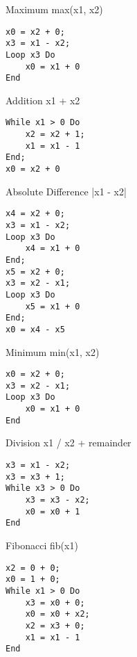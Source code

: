 \begin{minipage}{0.5\linewidth}
\begin{example2}{Maximum} max(x1, x2)
\begin{lstlisting}[style=Pseudocode, aboveskip=-0.05\baselineskip, belowskip=-0.5\baselineskip]
x0 = x2 + 0;
x3 = x1 - x2;
Loop x3 Do
    x0 = x1 + 0
End
\end{lstlisting}
\end{example2}

\begin{example2}{Addition} x1 + x2
\begin{lstlisting}[style=Pseudocode, aboveskip=-0.05\baselineskip, belowskip=-0.5\baselineskip]
While x1 > 0 Do
    x2 = x2 + 1;
    x1 = x1 - 1
End;
x0 = x2 + 0
\end{lstlisting}    
\end{example2}

\begin{example2}{Absolute Difference} |x1 - x2|
\begin{lstlisting}[style=Pseudocode, aboveskip=-0.05\baselineskip, belowskip=-0.5\baselineskip]
x4 = x2 + 0;
x3 = x1 - x2;
Loop x3 Do
    x4 = x1 + 0
End;
x5 = x2 + 0;
x3 = x2 - x1;
Loop x3 Do
    x5 = x1 + 0
End;
x0 = x4 - x5
\end{lstlisting}
\end{example2}
\end{minipage}
\begin{minipage}{0.5\linewidth}
\begin{example2}{Minimum} min(x1, x2)
\begin{lstlisting}[style=Pseudocode, aboveskip=-0.05\baselineskip, belowskip=-0.5\baselineskip]
x0 = x2 + 0;
x3 = x2 - x1;
Loop x3 Do
    x0 = x1 + 0
End
\end{lstlisting}
\end{example2} 
\begin{example2}{Division} x1 / x2 + remainder
\begin{lstlisting}[style=Pseudocode, aboveskip=-0.05\baselineskip, belowskip=-0.5\baselineskip]
x3 = x1 - x2;
x3 = x3 + 1;
While x3 > 0 Do
    x3 = x3 - x2;
    x0 = x0 + 1
End
\end{lstlisting}
\end{example2}

\begin{example2}{Fibonacci} fib(x1)
\begin{lstlisting}[style=Pseudocode, aboveskip=-0.05\baselineskip, belowskip=-0.5\baselineskip]
x2 = 0 + 0;
x0 = 1 + 0;
While x1 > 0 Do
    x3 = x0 + 0;
    x0 = x0 + x2;
    x2 = x3 + 0;
    x1 = x1 - 1
End
\end{lstlisting}
\end{example2}
\end{minipage}

